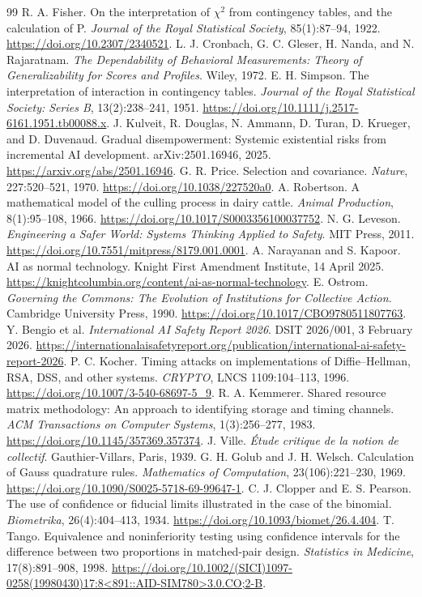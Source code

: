 \begin{thebibliography}{99}
 R. A. Fisher. On the interpretation of $\chi^2$ from contingency tables, and the calculation of P. \emph{Journal of the Royal Statistical Society}, 85(1):87--94, 1922. \url{https://doi.org/10.2307/2340521}.
 L. J. Cronbach, G. C. Gleser, H. Nanda, and N. Rajaratnam. \emph{The Dependability of Behavioral Measurements: Theory of Generalizability for Scores and Profiles}. Wiley, 1972.
 E. H. Simpson. The interpretation of interaction in contingency tables. \emph{Journal of the Royal Statistical Society: Series B}, 13(2):238--241, 1951. \url{https://doi.org/10.1111/j.2517-6161.1951.tb00088.x}.
 J. Kulveit, R. Douglas, N. Ammann, D. Turan, D. Krueger, and D. Duvenaud. Gradual disempowerment: Systemic existential risks from incremental AI development. arXiv:2501.16946, 2025. \url{https://arxiv.org/abs/2501.16946}.
 G. R. Price. Selection and covariance. \emph{Nature}, 227:520--521, 1970. \url{https://doi.org/10.1038/227520a0}.
 A. Robertson. A mathematical model of the culling process in dairy cattle. \emph{Animal Production}, 8(1):95--108, 1966. \url{https://doi.org/10.1017/S0003356100037752}.
 N. G. Leveson. \emph{Engineering a Safer World: Systems Thinking Applied to Safety}. MIT Press, 2011. \url{https://doi.org/10.7551/mitpress/8179.001.0001}.
 A. Narayanan and S. Kapoor. AI as normal technology. Knight First Amendment Institute, 14 April 2025. \url{https://knightcolumbia.org/content/ai-as-normal-technology}.
 E. Ostrom. \emph{Governing the Commons: The Evolution of Institutions for Collective Action}. Cambridge University Press, 1990. \url{https://doi.org/10.1017/CBO9780511807763}.
 Y. Bengio et al. \emph{International AI Safety Report 2026}. DSIT 2026/001, 3 February 2026. \url{https://internationalaisafetyreport.org/publication/international-ai-safety-report-2026}.
 P. C. Kocher. Timing attacks on implementations of Diffie--Hellman, RSA, DSS, and other systems. \emph{CRYPTO}, LNCS 1109:104--113, 1996. \url{https://doi.org/10.1007/3-540-68697-5_9}.
 R. A. Kemmerer. Shared resource matrix methodology: An approach to identifying storage and timing channels. \emph{ACM Transactions on Computer Systems}, 1(3):256--277, 1983. \url{https://doi.org/10.1145/357369.357374}.
 J. Ville. \emph{\'Etude critique de la notion de collectif}. Gauthier-Villars, Paris, 1939.
 G. H. Golub and J. H. Welsch. Calculation of Gauss quadrature rules. \emph{Mathematics of Computation}, 23(106):221--230, 1969. \url{https://doi.org/10.1090/S0025-5718-69-99647-1}.
 C. J. Clopper and E. S. Pearson. The use of confidence or fiducial limits illustrated in the case of the binomial. \emph{Biometrika}, 26(4):404--413, 1934. \url{https://doi.org/10.1093/biomet/26.4.404}.
 T. Tango. Equivalence and noninferiority testing using confidence intervals for the difference between two proportions in matched-pair design. \emph{Statistics in Medicine}, 17(8):891--908, 1998. \url{https://doi.org/10.1002/(SICI)1097-0258(19980430)17:8<891::AID-SIM780>3.0.CO;2-B}.
\end{thebibliography}
\endgroup
